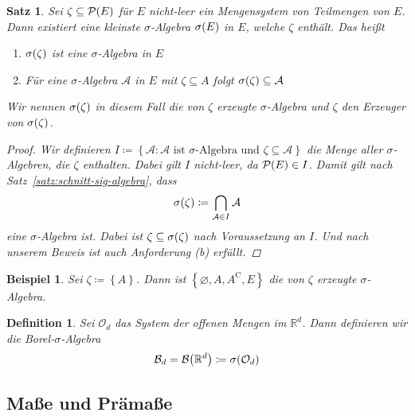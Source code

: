 \documentclass[11pt, twoside, a4paper]{article}
\theoremstyle{plain}
\newtheorem{definition}[blockelement]{Definition}
\newtheorem{satz}[blockelement]{Satz}
\newtheorem{beispiel}[blockelement]{Beispiel}
\numberwithin{equation}{subsection}
\newcommand{\set}[1]{\left\{#1\right\}}
\newcommand{\of}[1]{\mathopen{}\mathclose{}\bgroup\left(#1\aftergroup\egroup\right)}
\renewcommand{\emptyset}{\varnothing}
\newcommand{\comp}[1]{{#1}^{\mathrm{C}}}
\newcommand{\R}{\mathbb{R}}
\begin{document}
    \begin{satz} %
        Sei $\zeta \subseteq \mathcal{P}\of{E}$ für $E$ nicht-leer ein Mengensystem von Teilmengen von $E$. Dann existiert eine kleinste $\sigma$-Algebra $\sigma\of{E}$ in $E$, welche $\zeta$ enthält. Das heißt
        \begin{enumerate}[label=(\alph*)]
            \item $\sigma\of{\zeta}$ ist eine $\sigma$-Algebra in $E$
            \item Für eine $\sigma$-Algebra $\mathcal{A}$ in $E$ mit $\zeta\subseteq A$ folgt $\sigma\of{\zeta} \subseteq \mathcal{A}$
        \end{enumerate}
        Wir nennen $\sigma\of{\zeta}$ in diesem Fall die von $\zeta$ erzeugte $\sigma$-Algebra und $\zeta$ den Erzeuger von $\sigma\of{\zeta}$.
        \begin{proof}
            Wir definieren $I \coloneqq \set{\mathcal{A}: \mathcal{A} \text{ ist $\sigma$-Algebra und } \zeta\subseteq\mathcal{A}}$ die Menge aller $\sigma$-Algebren, die $\zeta$ enthalten. Dabei gilt $I$ nicht-leer, da $\mathcal{P}\of{E}\in I$. Damit gilt nach Satz~\ref{satz:schnitt-sig-algebra}, dass
            \begin{align*}
                \sigma\of{\zeta} \coloneqq \bigcap_{\mathcal{A}\in I} \mathcal{A}
            \end{align*}
            eine $\sigma$-Algebra ist. Dabei ist $\zeta \subseteq \sigma\of{\zeta}$ nach Voraussetzung an $I$. Und nach unserem Beweis ist auch Anforderung (b) erfüllt.
        \end{proof}
    \end{satz}

    \begin{beispiel}
        Sei $\zeta \coloneqq \set{A}$. Dann ist $\set{\emptyset, A, \comp{A}, E}$ die von $\zeta$ erzeugte $\sigma$-Algebra.
    \end{beispiel}

    \begin{definition}
        Sei $\mathcal{O}_d$ das System der offenen Mengen im $\R^d$. Dann definieren wir die \textit{Borel-$\sigma$-Algebra}
        \begin{align*}
            \mathcal{B}_d = \mathcal{B}\of{\R^d} \coloneqq \sigma\of{\mathcal{O}_d}
        \end{align*}
    \end{definition}

    \subsection{Maße und Prämaße}
\end{document}
